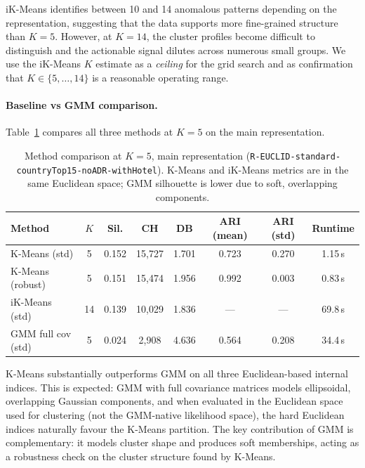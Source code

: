 \documentclass[12pt,a4paper]{article}
\begin{document}
iK-Means identifies between 10 and 14 anomalous patterns depending on
the representation, suggesting that the data supports more fine-grained
structure than $K=5$.
However, at $K=14$, the cluster profiles become difficult to distinguish
and the actionable signal dilutes across numerous small groups.
We use the iK-Means $K$ estimate as a \emph{ceiling} for the grid
search and as confirmation that $K \in \{5,\ldots,14\}$ is a reasonable
operating range.

\paragraph{Baseline vs GMM comparison.}
Table~\ref{tab:method_comparison} compares all three methods at $K=5$
on the main representation.

\begin{table}[H]
  \centering
  \caption{Method comparison at $K=5$, main representation
           (\texttt{R-EUCLID-standard-countryTop15-noADR-withHotel}).
           K-Means and iK-Means metrics are in the same Euclidean space;
           GMM silhouette is lower due to soft, overlapping components.}
  \label{tab:method_comparison}
  \small
  \begin{tabular}{@{}lccccccc@{}}
    \toprule
    Method & $K$ & Sil. & CH & DB & ARI (mean) & ARI (std) & Runtime \\
    \midrule
    K-Means (std)      & 5  & 0.152 & 15,727 & 1.701 & 0.723 & 0.270 & 1.15\,s \\
    K-Means (robust)   & 5  & 0.151 & 15,474 & 1.956 & 0.992 & 0.003 & 0.83\,s \\
    iK-Means (std)     & 14 & 0.139 & 10,029 & 1.836 & --- & --- & 69.8\,s \\
    GMM full cov (std) & 5  & 0.024 & 2,908  & 4.636 & 0.564 & 0.208 & 34.4\,s \\
    \bottomrule
  \end{tabular}
\end{table}

K-Means substantially outperforms GMM on all three Euclidean-based
internal indices.
This is expected: GMM with full covariance matrices models ellipsoidal,
overlapping Gaussian components, and when evaluated in the Euclidean
space used for clustering (not the GMM-native likelihood space), the hard
Euclidean indices naturally favour the K-Means partition.
The key contribution of GMM is complementary: it models cluster
shape and produces soft memberships, acting as a robustness check on
the cluster structure found by K-Means.
\end{document}
